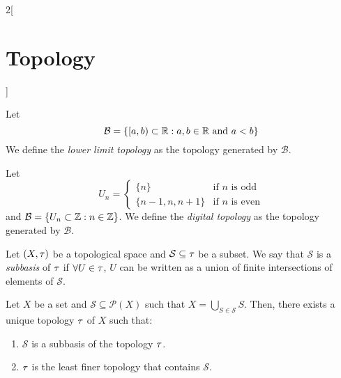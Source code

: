 \documentclass[../../../main.tex]{subfiles}
\begin{document}
\begin{multicols}{2}[\section{Topology}]
\begin{definition}
  \end{definition}
  \begin{definition}
    Let $$\mathcal{B}=\{[a,b)\subset\mathbb{R}:a,b\in\mathbb{R}\text{ and }a<b\}$$
    We define the \textit{lower limit topology} as the topology generated by $\mathcal{B}$.
  \end{definition}
  \begin{definition}
    Let
    $$U_n=\left\{
      \begin{array}{cl}
        \{n\}         & \text{if $n$ is odd}  \\
        \{n-1,n,n+1\} & \text{if $n$ is even}
      \end{array}\right.$$
    and $\mathcal{B}=\{U_n\subset \mathbb{Z}:n\in\mathbb{Z}\}$. We define the \textit{digital topology} as the topology generated by $\mathcal{B}$.
  \end{definition}
  \begin{definition}
    Let $(X,\tau)$ be a topological space and $\mathcal{S}\subseteq\tau$ be a subset. We say that $\mathcal{S}$ is a \textit{subbasis} of $\tau$ if $\forall U\in\tau$, $U$ can be written as a union of finite intersections of elements of $\mathcal{S}$.
  \end{definition}
  \begin{prop}
    Let $X$ be a set and $\mathcal{S}\subseteq\mathcal{P}(X)$ such that $X=\bigcup_{S\in\mathcal{S}} S$. Then, there exists a unique topology $\tau$ of $X$ such that:
    \begin{enumerate}
      \item $\mathcal{S}$ is a subbasis of the topology $\tau$.
      \item $\tau$ is the least finer topology that contains $\mathcal{S}$.
    \end{enumerate}
  \end{prop}

\end{multicols}
\end{document}

